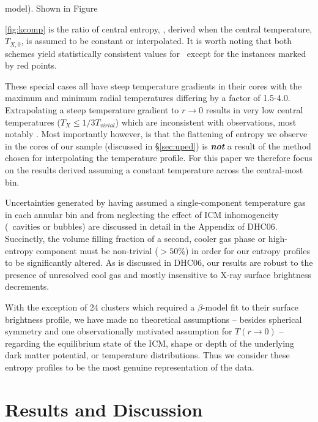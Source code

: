 \documentclass[12pt, preprint]{aastex}
\begin{document}
model). Shown in Figure {\ref{fig:kcomp} is the ratio of central
entropy, \kna, derived when the central temperature, $T_{X,0}$, is
assumed to be constant or interpolated. It is worth noting that both
schemes yield statistically consistent values for \kna\ except for the
instances marked by red points.

These special cases all have steep temperature gradients in their cores
with the maximum and minimum radial temperatures differing by a factor of
1.5-4.0. Extrapolating a steep temperature gradient to $r \rightarrow
0$ results in very low central temperatures ($T_X \leq 1/3
T_{virial}$) which are inconsistent with observations, most notably
\citealt{2003ApJ...590..207P}. Most importantly however, is that the
flattening of entropy we observe in the cores of our sample (discussed
in \S\ref{sec:uped}) is {\bfseries\em{not}} a result of the method
chosen for interpolating the temperature profile. For this paper we
therefore focus on the results derived assuming a constant temperature
across the central-most bin.

Uncertainties generated by having assumed a single-component
temperature gas in each annular bin and from neglecting the effect of
ICM inhomogeneity (\eg\ cavities or bubbles) are discussed in detail
in the Appendix of DHC06. Succinctly, the volume filling fraction of a
second, cooler gas phase or high-entropy component must be non-trivial
($> 50\%$) in order for our entropy profiles to be significantly
altered. As is discussed in DHC06, our results are robust to the
presence of unresolved cool gas and mostly insensitive to X-ray
surface brightness decrements.

With the exception of 24 clusters which required a $\beta$-model fit
to their surface brightness profile, we have made no theoretical
assumptions -- besides spherical symmetry and one observationally
motivated assumption for $T(r\rightarrow0)$ -- regarding the
equilibrium state of the ICM, shape or depth of the underlying dark
matter potential, or temperature distributions. Thus we consider these
entropy profiles to be the most genuine representation of the data.

\section{Results and Discussion}
\label{sec:r&d}

}
\end{document}
